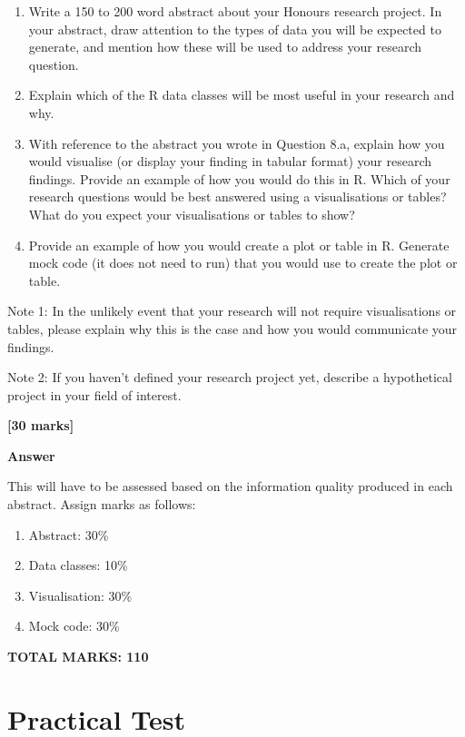 \documentclass[
  10t,
]{article}
\providecommand{\tightlist}{%
  \setlength{\itemsep}{0pt}\setlength{\parskip}{0pt}}
\begin{document}
\begin{enumerate}
\def\labelenumi{\alph{enumi}.}
\item
  Write a 150 to 200 word abstract about your Honours research project.
  In your abstract, draw attention to the types of data you will be
  expected to generate, and mention how these will be used to address
  your research question.
\item
  Explain which of the R data classes will be most useful in your
  research and why.
\item
  With reference to the abstract you wrote in Question 8.a, explain how
  you would visualise (or display your finding in tabular format) your
  research findings. Provide an example of how you would do this in R.
  Which of your research questions would be best answered using a
  visualisations or tables? What do you expect your visualisations or
  tables to show?
\item
  Provide an example of how you would create a plot or table in R.
  Generate mock code (it does not need to run) that you would use to
  create the plot or table.
\end{enumerate}

Note 1: In the unlikely event that your research will not require
visualisations or tables, please explain why this is the case and how
you would communicate your findings.

Note 2: If you haven't defined your research project yet, describe a
hypothetical project in your field of interest.

\textbf{{[}30 marks{]}}

\textbf{Answer}

This will have to be assessed based on the information quality produced
in each abstract. Assign marks as follows:

\begin{enumerate}
\def\labelenumi{\alph{enumi}.}
\tightlist
\item
  Abstract: 30\%
\item
  Data classes: 10\%
\item
  Visualisation: 30\%
\item
  Mock code: 30\%
\end{enumerate}

\textbf{TOTAL MARKS: 110}

\section{Practical Test}\label{practical-test}
\end{document}
